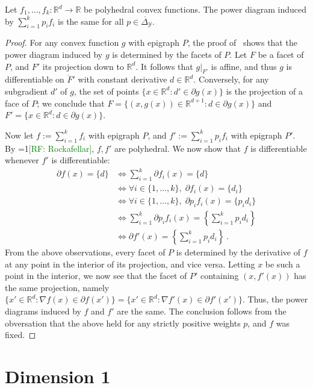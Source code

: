 \documentclass[anon,12pt]{colt2019}
\newcommand{\Comments}{1}
\newcommand{\mynote}[2]{\ifnum\Comments=1\textcolor{#1}{#2}\fi}
\newcommand{\raf}[1]{\mynote{green}{[RF: #1]}}
\newcommand{\reals}{\mathbb{R}}
\newcommand{\simplex}{\Delta_\Y}
\newcommand{\Y}{\mathcal{Y}}
\newcommand{\inter}[1]{\mathring{#1}}%
\begin{document}
\begin{lemma}\label{lem:polyhedral-pd-same}
  Let $f_1,\ldots,f_k:\reals^d\to\reals$ be polyhedral convex functions.
  The power diagram induced by $\sum_{i=1}^k p_i f_i$ is the same for all $p \in \inter\simplex$.
\end{lemma}
\begin{proof}
  For any convex function $g$ with epigraph $P$, the proof of~\citet[Theorem 4]{aurenhammer1987power} shows that the power diagram induced by $g$ is determined by the facets of $P$.
  Let $F$ be a facet of $P$, and $F'$ its projection down to $\reals^d$.
  It follows that $g|_{F'}$ is affine, and thus $g$ is differentiable on $\inter F'$ with constant derivative $d\in\reals^d$.
  Conversely, for any subgradient $d'$ of $g$, the set of points $\{x\in\reals^d : d'\in\partial g(x)\}$ is the projection of a face of $P$; we conclude that $F = \{(x,g(x))\in\reals^{d+1} : d\in\partial g(x)\}$ and $F' = \{x\in\reals^d : d\in\partial g(x)\}$.

  Now let $f := \sum_{i=1}^k f_i$ with epigraph $P$, and $f' := \sum_{i=1}^k p_i f_i$ with epigraph $P'$.
  By \raf{Rockafellar}, $f,f'$ are polyhedral.
  We now show that $f$ is differentiable whenever $f'$ is differentiable:
  \begin{align*}
    \partial f(x) = \{d\}
    &\iff \sum_{i=1}^k \partial f_i(x) = \{d\} \\
    &\iff \forall i\in\{1,\ldots,k\}, \; \partial f_i(x) = \{d_i\} \\
    &\iff \forall i\in\{1,\ldots,k\}, \; \partial p_i f_i(x) = \{p_id_i\} \\
    &\iff \sum_{i=1}^k \partial p_if_i(x) = \left\{\sum_{i=1}^k p_id_i\right\} \\
    &\iff \partial f'(x) = \left\{\sum_{i=1}^k p_id_i\right\}~.
  \end{align*}
  From the above observations, every facet of $P$ is determined by the derivative of $f$ at any point in the interior of its projection, and vice versa.
  Letting $x$ be such a point in the interior, we now see that the facet of $P'$ containing $(x,f'(x))$ has the same projection, namely $\{x'\in\reals^d : \nabla f(x) \in \partial f(x')\} = \{x'\in\reals^d : \nabla f'(x) \in \partial f'(x')\}$.
  Thus, the power diagrams induced by $f$ and $f'$ are the same.
  The conclusion follows from the obversation that the above held for any strictly positive weights $p$, and $f$ was fixed.
\end{proof}

\section{Dimension 1}\label{app:dimension-1}
\end{document}
